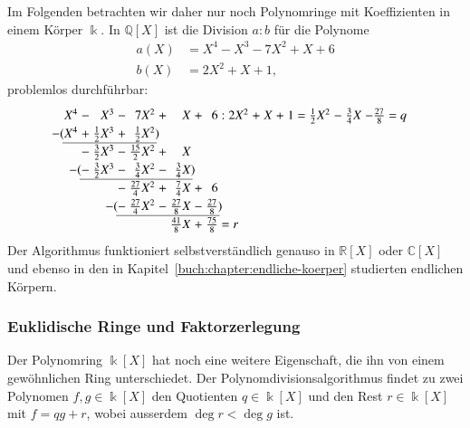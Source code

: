 \begin{beispiel}
Im Folgenden betrachten wir daher nur noch Polynomringe mit Koeffizienten
in einem Körper $\Bbbk$.
In $\mathbb{Q}[X]$ ist die Division $a:b$ für die Polynome
\begin{equation}
\begin{aligned}
a(X) &= X^4 - X^3 -7X^2 + X + 6\\
b(X) &= 2X^2+X+1,
\end{aligned}
\label{buch:polynome:eqn:divisionsaufgabe2}
\end{equation}
problemlos durchführbar:
\[
\arraycolsep=1.4pt
\renewcommand{\arraystretch}{1.2}
\begin{array}{rcrcrcrcrcrcrcrcrcrcr}
X^4&-&       X^3&-&         7X^2&+&          X&+&           6&:&2X^2&+&X&+&1&=&\frac12X^2&-&\frac34X&-\frac{27}{8} = q\\
\llap{$-($}X^4&+&\frac12X^3&+&   \frac12X^2\rlap{$)$}& &           & &            & &    & & & & & &          & &        &             \\ \cline{1-5}
   &-&\frac32X^3&-&\frac{15}2X^2&+&          X& &            & &    & & & & & &          & &        &             \\
   &\llap{$-($}-&\frac32X^3&-&\frac{ 3}4X^2&-&\frac{ 3}4X\rlap{$)$}& &            & &    & & & & & &          & &        &             \\\cline{2-7}
   & &          &-&\frac{27}4X^2&+&\frac{ 7}4X&+&           6& &    & & & & & &          & &        &             \\
   & &          &\llap{$-($}-&\frac{27}4X^2&-&\frac{27}8X&-&\frac{27}{8}\rlap{$)$}& &    & & & & & &          & &        &             \\\cline{4-9}
   & &          & &             & &\frac{41}8X&+&\frac{75}{8}\rlap{$\mathstrut=r$}& &    & & & & & &          & &        &             \\
\end{array}
\]
Der Algorithmus funktioniert selbstverständlich genauso in $\mathbb{R}[X]$
oder $\mathbb{C}[X]$ und ebenso in den in
Kapitel~\ref{buch:chapter:endliche-koerper} studierten endlichen Körpern.
\end{beispiel}

\subsubsection{Euklidische Ringe und Faktorzerlegung}
Der Polynomring $\Bbbk[X]$ hat noch eine weitere Eigenschaft, die ihn
von einem gewöhnlichen Ring unterschiedet.
Der Polynomdivisionsalgorithmus findet zu zwei Polynomen $f,g\in\Bbbk[X]$
den Quotienten $q\in\Bbbk[X]$ und den Rest $r\in\Bbbk[X]$ mit
$f=qg+r$, wobei ausserdem $\deg r<\deg g$ ist.

